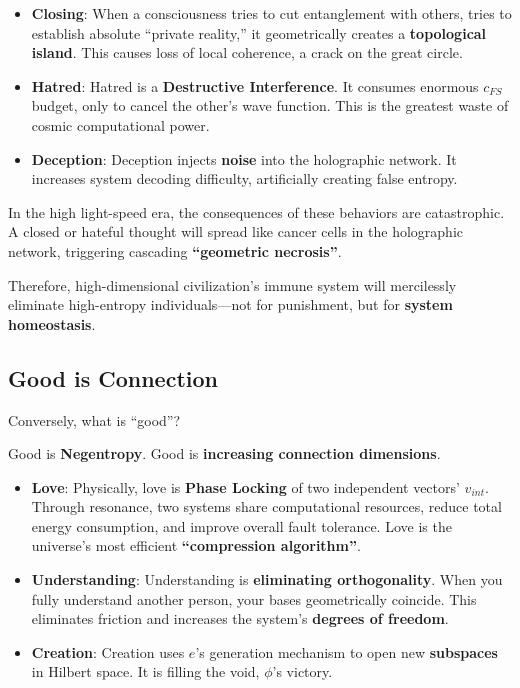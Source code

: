 \begin{itemize}
\item \textbf{Closing}: When a consciousness tries to cut entanglement with others, tries to establish absolute ``private reality,'' it geometrically creates a \textbf{topological island}. This causes loss of local coherence, a crack on the great circle.

\item \textbf{Hatred}: Hatred is a \textbf{Destructive Interference}. It consumes enormous $c_{FS}$ budget, only to cancel the other's wave function. This is the greatest waste of cosmic computational power.

\item \textbf{Deception}: Deception injects \textbf{noise} into the holographic network. It increases system decoding difficulty, artificially creating false entropy.
\end{itemize}

In the high light-speed era, the consequences of these behaviors are catastrophic. A closed or hateful thought will spread like cancer cells in the holographic network, triggering cascading \textbf{``geometric necrosis''}.

Therefore, high-dimensional civilization's immune system will mercilessly eliminate high-entropy individuals---not for punishment, but for \textbf{system homeostasis}.

\subsection{Good is Connection}

Conversely, what is ``good''?

Good is \textbf{Negentropy}. Good is \textbf{increasing connection dimensions}.

\begin{itemize}
\item \textbf{Love}: Physically, love is \textbf{Phase Locking} of two independent vectors' $v_{int}$. Through resonance, two systems share computational resources, reduce total energy consumption, and improve overall fault tolerance. Love is the universe's most efficient \textbf{``compression algorithm''}.

\item \textbf{Understanding}: Understanding is \textbf{eliminating orthogonality}. When you fully understand another person, your bases geometrically coincide. This eliminates friction and increases the system's \textbf{degrees of freedom}.

\item \textbf{Creation}: Creation uses $e$'s generation mechanism to open new \textbf{subspaces} in Hilbert space. It is filling the void, $\phi$'s victory.
\end{itemize}

